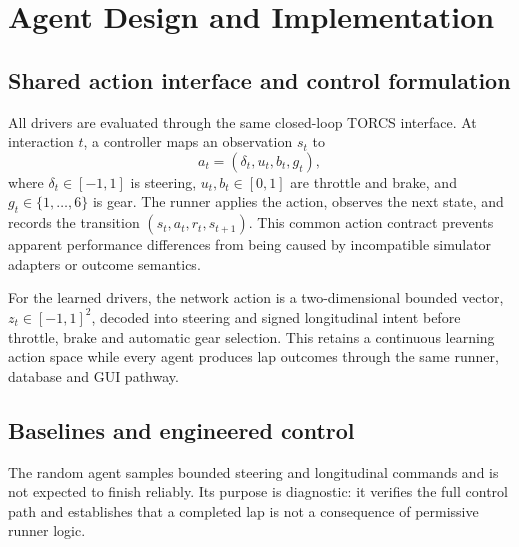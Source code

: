 \section{Agent Design and Implementation}
\label{ch:agent-design}

\subsection{Shared action interface and control formulation}

All drivers are evaluated through the same closed-loop TORCS interface. At interaction $t$, a controller maps an observation $s_t$ to
\begin{equation*}
  a_t=(\delta_t,u_t,b_t,g_t),
\end{equation*}
where $\delta_t\in[-1,1]$ is steering, $u_t,b_t\in[0,1]$ are throttle and brake, and $g_t\in\{1,\ldots,6\}$ is gear. The runner applies the action, observes the next state, and records the transition $(s_t,a_t,r_t,s_{t+1})$. This common action contract prevents apparent performance differences from being caused by incompatible simulator adapters or outcome semantics.

For the learned drivers, the network action is a two-dimensional bounded vector, $z_t\in[-1,1]^2$, decoded into steering and signed longitudinal intent before throttle, brake and automatic gear selection. This retains a continuous learning action space while every agent produces lap outcomes through the same runner, database and GUI pathway.

\subsection{Baselines and engineered control}

The random agent samples bounded steering and longitudinal commands and is not expected to finish reliably. Its purpose is diagnostic: it verifies the full control path and establishes that a completed lap is not a consequence of permissive runner logic.

